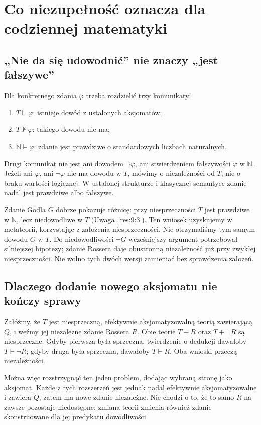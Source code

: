 \section{Co niezupełność oznacza dla codziennej matematyki}\label{sec:codzienna-matematyka}
\subsection*{„Nie da się udowodnić” nie znaczy „jest fałszywe”}\label{sec:16:1}
Dla konkretnego zdania $\varphi$ trzeba rozdzielić trzy komunikaty:
\begin{enumerate}[label=(\arabic*)]
\item $T\vdash\varphi$: istnieje dowód z ustalonych aksjomatów;
\item $T\nvdash\varphi$: takiego dowodu nie ma;
\item $\mathbb N\models\varphi$: zdanie jest prawdziwe o standardowych liczbach naturalnych.
\end{enumerate}
Drugi komunikat nie jest ani dowodem $\neg\varphi$, ani stwierdzeniem fałszywości $\varphi$ w $\mathbb N$. Jeżeli ani $\varphi$, ani $\neg\varphi$ nie ma dowodu w $T$, mówimy o niezależności od $T$, nie o braku wartości logicznej. W ustalonej strukturze i klasycznej semantyce zdanie nadal jest prawdziwe albo fałszywe.

Zdanie Gödla $G$ dobrze pokazuje różnicę: przy niesprzeczności $T$ jest prawdziwe w $\mathbb N$, lecz niedowodliwe w $T$ (Uwaga~\ref{res:9:3}). Ten wniosek uzyskujemy w metateorii, korzystając z założenia niesprzeczności. Nie otrzymaliśmy tym samym dowodu $G$ w $T$. Do niedowodliwości $\neg G$ wcześniejszy argument potrzebował silniejszej hipotezy; zdanie Rossera daje obustronną niezależność już przy zwykłej niesprzeczności. Nie wolno tych dwóch wersji zamieniać bez sprawdzenia założeń.

\subsection*{Dlaczego dodanie nowego aksjomatu nie kończy sprawy}\label{sec:16:2}
Załóżmy, że $T$ jest niesprzeczną, efektywnie aksjomatyzowalną teorią zawierającą $Q$, i weźmy jej niezależne zdanie Rossera $R$. Obie teorie $T+R$ oraz $T+\neg R$ są niesprzeczne. Gdyby pierwsza była sprzeczna, twierdzenie o dedukcji dawałoby $T\vdash\neg R$; gdyby druga była sprzeczna, dawałoby $T\vdash R$. Oba wnioski przeczą niezależności.

Można więc rozstrzygnąć ten jeden problem, dodając wybraną stronę jako aksjomat. Każde z tych rozszerzeń jest jednak nadal efektywnie aksjomatyzowalne i zawiera $Q$, zatem ma nowe zdanie niezależne. Nie chodzi o to, że to samo $R$ na zawsze pozostaje niedostępne: zmiana teorii zmienia również zdanie skonstruowane dla jej predykatu dowodliwości.


